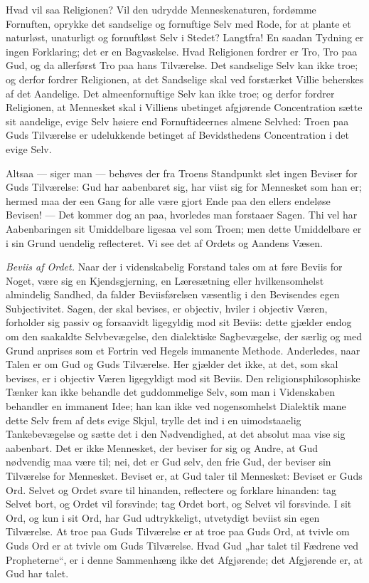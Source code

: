\documentclass[12pt]{book}
\begin{document}
Hvad vil saa Religionen? Vil den udrydde Menneskenaturen, fordømme
Fornuften, oprykke det sandselige og fornuftige Selv med Rode, for
at plante et naturløst, unaturligt og fornuftløst Selv i Stedet?
Langtfra! En saadan Tydning er ingen Forklaring; det er en
Bagvaskelse. Hvad Religionen fordrer er Tro, Tro paa Gud, og da
allerførst Tro paa hans Tilværelse. Det sandselige Selv kan ikke
troe; og derfor fordrer Religionen, at det Sandselige skal ved
forstærket Villie beherskes af det Aandelige. Det almeenfornuftige
Selv kan ikke troe; og derfor fordrer Religionen, at Mennesket skal
i Villiens ubetinget afgjørende Concentration sætte sit aandelige,
evige Selv høiere end Fornuftideernes almene Selvhed: Troen paa Guds
Tilværelse er udelukkende betinget af Bevidsthedens Concentration i
det evige Selv.

Altsaa --- siger man --- behøves der fra Troens Standpunkt slet
ingen Beviser for Guds Tilværelse: Gud har aabenbaret sig, har viist
sig for Mennesket som han
er; hermed maa der een Gang for alle være gjort Ende paa den ellers
endeløse Bevisen! --- Det kommer dog an paa, hvorledes man forstaaer
Sagen. Thi vel har Aabenbaringen sit Umiddelbare ligesaa vel som
Troen; men dette Umiddelbare er i sin Grund uendelig reflecteret. Vi
see det af Ordets og Aandens Væsen.

\emph{Beviis af Ordet.} Naar der i videnskabelig Forstand tales om
at føre Beviis for Noget, være sig en Kjendsgjerning, en
Læresætning eller hvilkensomhelst almindelig Sandhed, da falder
Beviisførelsen væsentlig i den Bevisendes egen Subjectivitet. Sagen,
der skal bevises, er objectiv, hviler i objectiv Væren, forholder
sig passiv og forsaavidt ligegyldig mod sit Beviis: dette gjælder
endog om den saakaldte Selvbevægelse, den dialektiske Sagbevægelse,
der særlig og med Grund anprises som et Fortrin ved Hegels immanente
Methode. Anderledes, naar Talen er om Gud og Guds Tilværelse. Her
gjælder det ikke, at det, som skal bevises, er i objectiv Væren
ligegyldigt mod sit Beviis. Den religionsphilosophiske Tænker kan
ikke behandle det guddommelige Selv, som man i Videnskaben behandler
en immanent Idee; han kan ikke ved nogensomhelst Dialektik mane
dette Selv frem af dets evige Skjul, trylle det ind i en
uimodstaaelig Tankebevægelse og sætte det i den Nødvendighed, at det
absolut maa vise sig aabenbart. Det er ikke Mennesket, der beviser
for sig og Andre, at Gud nødvendig maa være til; nei, det er Gud
selv, den frie Gud, der beviser sin Tilværelse for Mennesket.
Beviset er, at Gud taler til Mennesket: Beviset er Guds Ord. Selvet
og Ordet svare til hinanden, reflectere og forklare hinanden: tag
Selvet bort, og Ordet vil forsvinde; tag Ordet bort, og Selvet vil
forsvinde. I sit Ord, og kun i sit Ord, har Gud udtrykkeligt,
utvetydigt beviist sin egen Tilværelse. At troe paa Guds Tilværelse
er at troe paa Guds Ord, at tvivle om Guds Ord er at tvivle om Guds
Tilværelse. Hvad Gud „har talet til Fædrene ved Propheterne“, er i
denne Sammenhæng ikke det Afgjørende; det Afgjørende er, at Gud har
talet.
\end{document}
